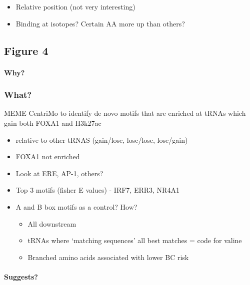 \documentclass[
  12pt,
]{article}
\begin{document}
\begin{itemize}
\item
  Relative position (not very interesting)
\item
  Binding at isotopes?
  Certain AA more up than others?
\end{itemize}

\hypertarget{figure-4}{%
\subsection{Figure 4}\label{figure-4}}

\hypertarget{why-1}{%
\paragraph{Why?}\label{why-1}}

\hypertarget{what}{%
\subsubsection{What?}\label{what}}

MEME CentriMo to identify de novo motifs that are enriched at tRNAs which gain both FOXA1 and H3k27ac

\begin{itemize}
\item
  relative to other tRNAS (gain/lose, lose/lose, lose/gain)
\item
  FOXA1 not enriched
\item
  Look at ERE, AP-1, others?
\item
  Top 3 motifs (fisher E values) - IRF7, ERR3, NR4A1
\item
  A and B box motifs as a control?
  How?

  \begin{itemize}
  \item
    All downstream
  \item
    tRNAs where `matching sequences' all best matches = code for valine
  \item
    Branched amino acids associated with lower BC risk
  \end{itemize}
\end{itemize}

\hypertarget{suggests}{%
\paragraph{Suggests?}\label{suggests}}
\end{document}
